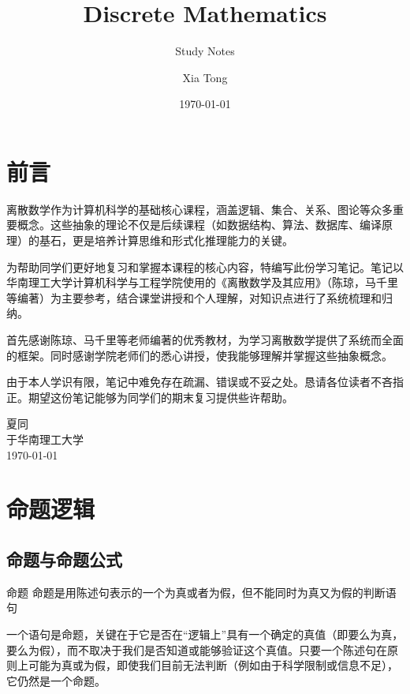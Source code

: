 \documentclass[lang=cn,11pt]{elegantbook}
\title{Discrete Mathematics}
\subtitle{Study Notes}
\author{Xia Tong}
\institute{South China University of Technology}
\date{\today}
\begin{document}
\maketitle
\frontmatter\chapter*{前言}

离散数学作为计算机科学的基础核心课程，涵盖逻辑、集合、关系、图论等众多重要概念。这些抽象的理论不仅是后续课程（如数据结构、算法、数据库、编译原理）的基石，更是培养计算思维和形式化推理能力的关键。

为帮助同学们更好地复习和掌握本课程的核心内容，特编写此份学习笔记。笔记以华南理工大学计算机科学与工程学院使用的《离散数学及其应用》（陈琼，马千里等编著）为主要参考，结合课堂讲授和个人理解，对知识点进行了系统梳理和归纳。

首先感谢陈琼、马千里等老师编著的优秀教材，为学习离散数学提供了系统而全面的框架。同时感谢学院老师们的悉心讲授，使我能够理解并掌握这些抽象概念。

由于本人学识有限，笔记中难免存在疏漏、错误或不妥之处。恳请各位读者不吝指正。期望这份笔记能够为同学们的期末复习提供些许帮助。

\vspace{0.5cm}
\begin{flushright}
夏同\\
于华南理工大学\\
\today
\end{flushright}


\tableofcontents
\makeenvindex

\mainmatter
\chapter{命题逻辑}
\section{命题与命题公式}
\begin{definition}{命题}
    命题是用陈述句表示的一个为真或者为假，但不能同时为真又为假的判断语句
\end{definition}
一个语句是命题，关键在于它是否在“逻辑上”具有一个确定的真值（即要么为真，要么为假），而不取决于我们是否知道或能够验证这个真值。只要一个陈述句在原则上可能为真或为假，即使我们目前无法判断（例如由于科学限制或信息不足），它仍然是一个命题。
\end{document}
